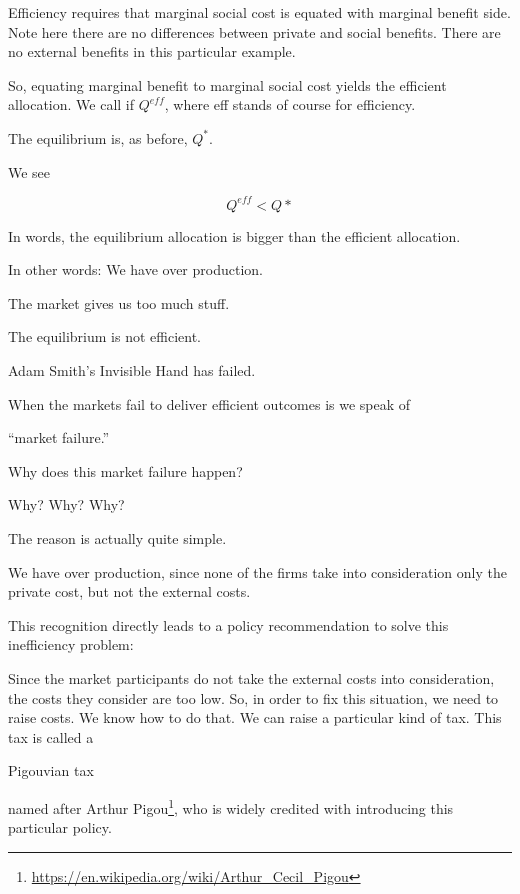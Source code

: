 \documentclass[
]{book}
\begin{document}
Efficiency requires that marginal social cost is equated with marginal benefit side. Note here there are no differences between private and social benefits. There are no external benefits in this particular example.

So, equating marginal benefit to marginal social cost yields the efficient allocation. We call if \(Q^{eff}\), where eff stands of course for efficiency.

The equilibrium is, as before, \(Q^*\).

We see

\[Q^{eff} < Q*\]

In words, the equilibrium allocation is bigger than the efficient allocation.

In other words: We have over production.

The market gives us too much stuff.

The equilibrium is not efficient.

Adam Smith's Invisible Hand has failed.

When the markets fail to deliver efficient outcomes is we speak of

\begin{center}
``market failure.''

\end{center}

Why does this market failure happen?

Why? Why? Why?

The reason is actually quite simple.

We have over production, since none of the firms take into consideration only the private cost, but not the external costs.

This recognition directly leads to a policy recommendation to solve this inefficiency problem:

Since the market participants do not take the external costs into consideration, the costs they consider are too low. So, in order to fix this situation, we need to raise costs. We know how to do that. We can raise a particular kind of tax. This tax is called a

\begin{center}
Pigouvian tax

\end{center}

named after Arthur Pigou\footnote{\url{https://en.wikipedia.org/wiki/Arthur_Cecil_Pigou}}, who is widely credited with introducing this particular policy.
\end{document}
